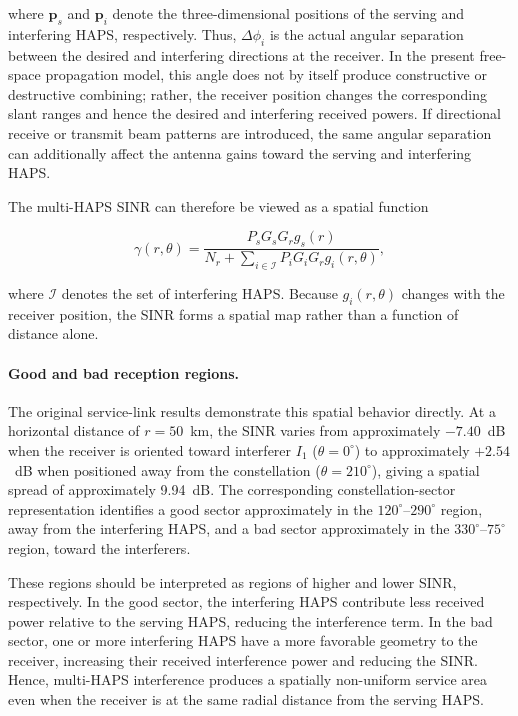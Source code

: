 \documentclass[conference]{IEEEtran}
\begin{document}
where $\mathbf{p}_s$ and $\mathbf{p}_i$ denote the three-dimensional positions of the serving and interfering HAPS, respectively. Thus, $\Delta\phi_i$ is the actual angular separation between the desired and interfering directions at the receiver. In the present free-space propagation model, this angle does not by itself produce constructive or destructive combining; rather, the receiver position changes the corresponding slant ranges and hence the desired and interfering received powers. If directional receive or transmit beam patterns are introduced, the same angular separation can additionally affect the antenna gains toward the serving and interfering HAPS.

The multi-HAPS SINR can therefore be viewed as a spatial function

\begin{equation}
\gamma(r,\theta)
=
\frac{
P_sG_sG_r g_s(r)
}{
N_r
+
\displaystyle\sum_{i\in\mathcal{I}}
P_iG_iG_r g_i(r,\theta)
},
\label{eq:spatial-sinr}
\end{equation}

where $\mathcal{I}$ denotes the set of interfering HAPS. Because $g_i(r,\theta)$ changes with the receiver position, the SINR forms a spatial map rather than a function of distance alone.

\paragraph{Good and bad reception regions.}

The original service-link results demonstrate this spatial behavior directly. At a horizontal distance of $r=50$~km, the SINR varies from approximately $-7.40$~dB when the receiver is oriented toward interferer $I_1$ ($\theta=0^\circ$) to approximately $+2.54$~dB when positioned away from the constellation ($\theta=210^\circ$), giving a spatial spread of approximately 9.94~dB. The corresponding constellation-sector representation identifies a good sector approximately in the $120^\circ$--$290^\circ$ region, away from the interfering HAPS, and a bad sector approximately in the $330^\circ$--$75^\circ$ region, toward the interferers.

These regions should be interpreted as regions of higher and lower SINR, respectively. In the good sector, the interfering HAPS contribute less received power relative to the serving HAPS, reducing the interference term. In the bad sector, one or more interfering HAPS have a more favorable geometry to the receiver, increasing their received interference power and reducing the SINR. Hence, multi-HAPS interference produces a spatially non-uniform service area even when the receiver is at the same radial distance from the serving HAPS.
\end{document}
